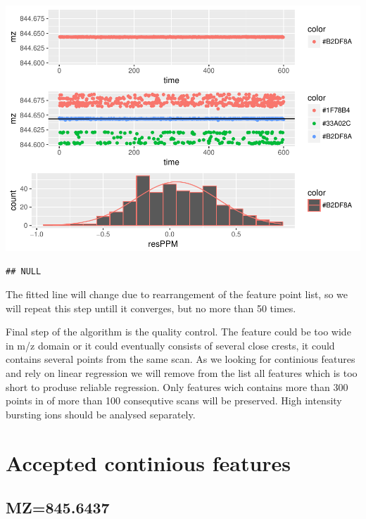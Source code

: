 \documentclass[]{article}
\newenvironment{Shaded}{\begin{snugshade}}{\end{snugshade}}
\newcommand{\KeywordTok}[1]{\textcolor[rgb]{0.13,0.29,0.53}{\textbf{#1}}}
\newcommand{\FloatTok}[1]{\textcolor[rgb]{0.00,0.00,0.81}{#1}}
\newcommand{\OperatorTok}[1]{\textcolor[rgb]{0.81,0.36,0.00}{\textbf{#1}}}
\newcommand{\NormalTok}[1]{#1}
\begin{document}
\includegraphics{Supplementary_document_files/figure-latex/filter.lm-1.pdf}

\begin{verbatim}
## NULL
\end{verbatim}

The fitted line will change due to rearrangement of the feature point
list, so we will repeat this step untill it converges, but no more than
50 times.

Final step of the algorithm is the quality control. The feature could be
too wide in m/z domain or it could eventually consists of several close
crests, it could contains several points from the same scan. As we
looking for continious features and rely on linear regression we will
remove from the list all features which is too short to produse reliable
regression. Only features wich contains more than 300 points in of more
than 100 consequtive scans will be preserved. High intensity bursting
ions should be analysed separately.

\section{Accepted continious
features}\label{accepted-continious-features}

\subsection{MZ=845.6437}\label{mz845.6437}

\begin{Shaded}
\end{Shaded}
\end{document}
